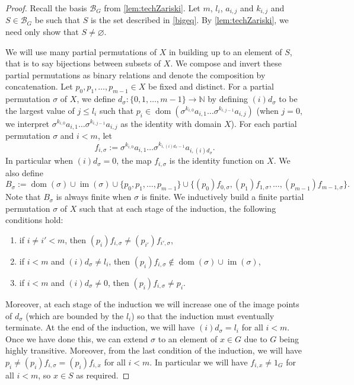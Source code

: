 \documentclass[11pt]{amsart}
\newcommand{\N}{\mathbb N}
\newcommand{\im}{\operatorname{im}}
\newcommand{\dom}{\operatorname{dom}}
\begin{document}
\begin{proof}
   Recall the basis \(\mathcal{B}_G\) from \cref{lem:techZariski}.
Let \(m\), \(l_i\), \(a_{i,j}\) and \(k_{i,j}\) and \(S\in \mathcal{B}_G\) be such that \(S\) is the set described in  \cref{bigeq}.
    By \cref{lem:techZariski}, we need only show that \(S\neq \varnothing\).

    We will use many partial permutations of \(X\) in building up to an element of \(S\), that is to say bijections between subsets of \(X\).
     We compose and invert these partial permutations as binary relations and denote the composition by concatenation.
     Let \(p_0,p_1,\ldots, p_{m-1}\in X\) be fixed and distinct.
    For a partial permutation \(\sigma\) of \(X\), we define \(d_\sigma:\{0,1,\ldots,m-1\}\to \N\) by
     defining \((i)d_{\sigma}\) to be the largest value of \(j\leq l_i\) such that \(p_i\in \operatorname{dom}(\sigma^{k_{i,0}}a_{i,1}\ldots \sigma^{k_{i,j-1}}a_{i, j})\) (when \(j=0\), we interpret \(\sigma^{k_{i,0}}a_{i,1}\ldots \sigma^{k_{i,j-1}}a_{i, j}\) as the identity with domain \(X\)). 
     For each partial permutation \(\sigma\) and \(i<m\), let 
     \[f_{i,\sigma}:=\sigma^{k_{i,0}}a_{i,1}\ldots \sigma^{k_{i,(i)d_\sigma-1}}a_{i, (i)d_\sigma}.\]
     In particular when \((i)d_{\sigma}=0\), the map \(f_{i,\sigma}\) is the identity function on \(X\).
     We also define
     \[B_\sigma :=\dom(\sigma)\cup \im(\sigma)\cup \{p_0,p_1,\ldots,p_{m-1}\}\cup \{(p_0)f_{0,\sigma},(p_1)f_{1,\sigma},\ldots, (p_{m-1})f_{m-1,\sigma}\}.\]
     Note that \(B_\sigma\) is always finite when \(\sigma\) is finite.
     We inductively build a finite partial permutation \(\sigma\) of \(X\) such that at each stage of the induction, the following conditions hold:
     \begin{enumerate}
      \item[($\sigma$1)] if \(i\neq i'<m\), then \((p_i)f_{i,\sigma}\neq (p_{i'})f_{i',\sigma}\),
         \item[($\sigma$2)] if \(i<m\) and \((i)d_\sigma \neq l_i\), then  \((p_i)f_{i,\sigma}\notin \dom(\sigma)\cup \im(\sigma)\),
         \item[($\sigma$3)] if \(i<m\) and \((i)d_\sigma\neq 0\), then  \((p_i)f_{i,\sigma}\neq p_i\).
     \end{enumerate}
     Moreover, at each stage of the induction we will increase one of the image points of \(d_\sigma\) (which are bounded by the \(l_i\)) so that the induction must eventually terminate. 
     At the end of the induction, we will have \((i)d_\sigma=l_i\) for all \(i<m\). 
     Once we have done this, we can extend \(\sigma\) to an element of \(x\in G\) due to \(G\) being highly transitive. Moreover, from the last condition of the induction, we will have \(p_i\neq (p_i)f_{i,\sigma}=(p_i)f_{i,x}\) for all \(i<m\). In particular we will have \(f_{i,x}\neq 1_G\) for all \(i<m\), so \(x\in S\) as required.


\end{proof}
\end{document}
